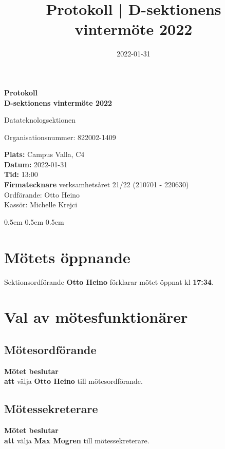 \documentclass{datateknologsektionen-document}
\title{Protokoll | D-sektionens vintermöte 2022}
\date{2022-01-31}
\newcommand{\ind}{\hspace*{2em}}
\newcommand{\motetbeslutar}{\textbf{Mötet beslutar}}
\newcommand{\att}{\\\ind\textbf{att}}
\begin{document}
\hspace{0pt}
\vfill
\begin{center}
    \Huge\textbf{Protokoll \\ D-sektionens vintermöte 2022}

    \huge Datateknologsektionen

    \large
    Organisationsnummer: 822002-1409

\end{center}
\vfill
{\large
    \textbf{Plats:} Campus Valla, C4 \\
    \textbf{Datum:} 2022-01-31 \\
    \textbf{Tid:} 13:00 \\
    \textbf{Firmatecknare} verksamhetsåret 21/22 (210701 - 220630) \\
    \ind Ordförande: Otto Heino \\
    \ind Kassör: Michelle Krejci 
}
\vfill
\hspace{0pt}
\pagebreak




\advance\cftsecnumwidth 0.5em\relax
\advance\cftsubsecindent 0.5em\relax
\advance\cftsubsecnumwidth 0.5em\relax
\tableofcontents
\pagebreak





\section{Mötets öppnande}
Sektionsordförande \textbf{Otto Heino} förklarar mötet öppnat kl \textbf{17:34}.




\section{Val av mötesfunktionärer}
\subsection{Mötesordförande}
\motetbeslutar\att{} välja \textbf{Otto Heino} till mötesordförande.

\subsection{Mötessekreterare}
\motetbeslutar\att{} välja \textbf{Max Mogren} till mötessekreterare.
\end{document}
